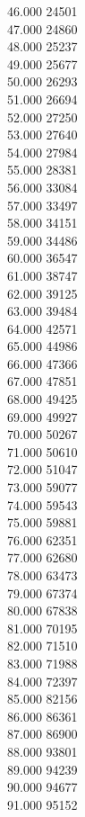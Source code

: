 { 46.000	24501 \\
 47.000	24860 \\
 48.000	25237 \\
 49.000	25677 \\
 50.000	26293 \\
 51.000	26694 \\
 52.000	27250 \\
 53.000	27640 \\
 54.000	27984 \\
 55.000	28381 \\
 56.000	33084 \\
 57.000	33497 \\
 58.000	34151 \\
 59.000	34486 \\
 60.000	36547 \\
 61.000	38747 \\
 62.000	39125 \\
 63.000	39484 \\
 64.000	42571 \\
 65.000	44986 \\
 66.000	47366 \\
 67.000	47851 \\
 68.000	49425 \\
 69.000	49927 \\
 70.000	50267 \\
 71.000	50610 \\
 72.000	51047 \\
 73.000	59077 \\
 74.000	59543 \\
 75.000	59881 \\
 76.000	62351 \\
 77.000	62680 \\
 78.000	63473 \\
 79.000	67374 \\
 80.000	67838 \\
 81.000	70195 \\
 82.000	71510 \\
 83.000	71988 \\
 84.000	72397 \\
 85.000	82156 \\
 86.000	86361 \\
 87.000	86900 \\
 88.000	93801 \\
 89.000	94239 \\
 90.000	94677 \\
 91.000	95152 \\
}
